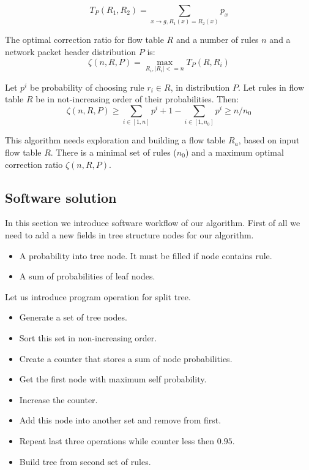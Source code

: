 \documentclass[conference]{IEEEtran}
\begin{document}
        \[T_P(R_1, R_2) = \sum_{x \rightarrow g, R_1(x) = R_2(x)} p_x\]

        The optimal correction ratio for flow table \(R\) and a number of rules \(n\) and a network packet header distribution \(P\) is:
        \[\zeta(n, R, P) = \max_{R_i, |R_i| <= n} T_P(R, R_i)\]
        
        Let \(p^i\) be probability of choosing rule \(r_i \in R\), in distribution \(P\). Let
        rules in flow table \(R\) be in not-increasing order of their probabilities. Then:
        \[\zeta(n, R, P) \geq \sum_{i \in [1, n]} p^i + 1 - \sum_{i \in [1, n_0]} p^i \geq n/n_0\]
        
        This algorithm needs exploration and building a flow table \(R_a\), based on input flow table \(R\). 
        There is a minimal set of rules (\(n_0\)) and a maximum optimal correction ratio \(\zeta(n, R, P)\).
        
        \subsection{Software solution}
            In this section we introduce software workflow of our algorithm.
            First of all we need to add a new fields in tree structure nodes for our algorithm.
            \begin{itemize}
                \item A probability into tree node. It must be filled if node contains rule.
                \item A sum of probabilities of leaf nodes.
            \end{itemize}
            
            Let us introduce program operation for split tree.
            \begin{itemize}
                \item Generate a set of tree nodes.
                \item Sort this set in non-increasing order.
                \item Create a counter that stores a sum of node probabilities.
                \item Get the first node with maximum self probability.
                \item Increase the counter.
                \item Add this node into another set and remove from first.
                \item Repeat last three operations while counter less then \(0.95\).
                \item Build tree from second set of rules.
            \end{itemize}
\end{document}
